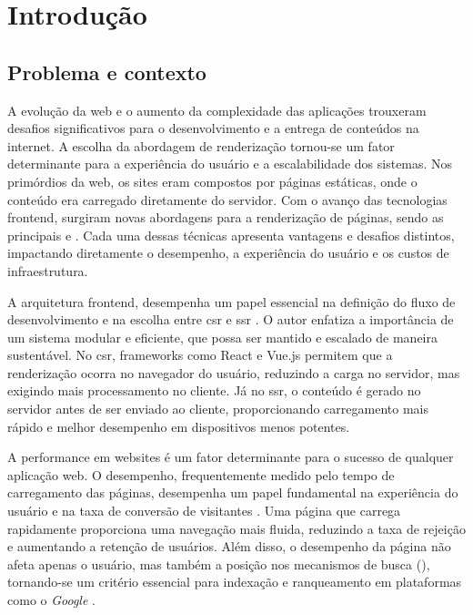 \chapter{Introdução}
\label{cap:introducao}

\section{Problema e contexto}
A evolução da web e o aumento da complexidade das aplicações trouxeram desafios significativos para o desenvolvimento e a entrega de conteúdos na internet. A escolha da abordagem de renderização tornou-se um fator determinante para a experiência do usuário e a escalabilidade dos sistemas. Nos primórdios da web, os sites eram compostos por páginas estáticas, onde o conteúdo era carregado diretamente do servidor. Com o avanço das tecnologias frontend, surgiram novas abordagens para a renderização de páginas, sendo as principais  e . Cada uma dessas técnicas apresenta vantagens e desafios distintos, impactando diretamente o desempenho, a experiência do usuário e os custos de infraestrutura.

A arquitetura frontend, desempenha um papel essencial na definição do fluxo de desenvolvimento e na escolha entre \acrshort{csr} e \acrshort{ssr} \cite{frontendGodbolt}. O autor enfatiza a importância de um sistema modular e eficiente, que possa ser mantido e escalado de maneira sustentável. No \acrshort{csr}, frameworks como React e Vue.js permitem que a renderização ocorra no navegador do usuário, reduzindo a carga no servidor, mas exigindo mais processamento no cliente. Já no \acrshort{ssr}, o conteúdo é gerado no servidor antes de ser enviado ao cliente, proporcionando carregamento mais rápido e melhor desempenho em dispositivos menos potentes.

A performance em websites é um fator determinante para o sucesso de qualquer aplicação web. O desempenho, frequentemente medido pelo tempo de carregamento das páginas, desempenha um papel fundamental na experiência do usuário e na taxa de conversão de visitantes \cite{webPerformance}. Uma página que carrega rapidamente proporciona uma navegação mais fluida, reduzindo a taxa de rejeição e aumentando a retenção de usuários. Além disso, o desempenho da página não afeta apenas o usuário, mas também a posição nos mecanismos de busca (), tornando-se um critério essencial para indexação e ranqueamento em plataformas como o \emph{Google} \cite{google}.

